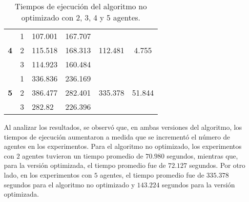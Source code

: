 \begin{table}[H]
{\begin{tabular}{|c|c|llcc|}
		\multirow{3}{*}{\textbf{4}}       & 1                                 & \multicolumn{1}{l|}{107.001}                   & \multicolumn{1}{l|}{167.707}                                & \multicolumn{1}{c|}{\multirow{3}{*}{112.481}}           & \multirow{3}{*}{4.755}           \\ \cline{2-4}
		& 2                                 & \multicolumn{1}{l|}{115.518}                   & \multicolumn{1}{l|}{168.313}                                & \multicolumn{1}{c|}{}                                   &                                  \\ \cline{2-4}
		& 3                                 & \multicolumn{1}{l|}{114.923}                   & \multicolumn{1}{l|}{160.484}                                & \multicolumn{1}{c|}{}                                   &                                  \\ \hline
		\multirow{3}{*}{\textbf{5}}       & 1                                 & \multicolumn{1}{l|}{336.836}                   & \multicolumn{1}{l|}{236.169}                                & \multicolumn{1}{c|}{\multirow{3}{*}{335.378}}           & \multirow{3}{*}{51.844}          \\ \cline{2-4}
		& 2                                 & \multicolumn{1}{l|}{386.477}                   & \multicolumn{1}{l|}{282.401}                                & \multicolumn{1}{c|}{}                                   &                                  \\ \cline{2-4}
		& 3                                 & \multicolumn{1}{l|}{282.82}                    & \multicolumn{1}{l|}{226.396}                                & \multicolumn{1}{c|}{}                                   &                                  \\ \hline
	\end{tabular}}
	\caption{Tiempos de ejecución del algoritmo no optimizado con 2, 3, 4 y 5 agentes.}
	\label{cuadro:tiempos_nooptim}
\end{table}

Al analizar los resultados, se observó que, en ambas versiones del algoritmo, los tiempos de ejecución aumentaron a medida que se incrementó el número de agentes en los experimentos. Para el algoritmo no optimizado, los experimentos con $2$ agentes tuvieron un tiempo promedio de $70.980$ segundos, mientras que, para la versión optimizada, el tiempo promedio fue de $72.127$ segundos. Por otro lado, en los experimentos con $5$ agentes, el tiempo promedio fue de $335.378$ segundos para el algoritmo no optimizado y $143.224$ segundos para la versión optimizada.

